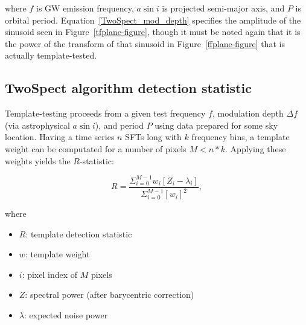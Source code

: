 \noindent where $f$ is GW emission frequency, $a \sin i$ is projected semi-major axis, and $P$ is orbital period.
Equation~\ref{TwoSpect_mod_depth} specifies the amplitude of the sinusoid seen in Figure~\ref{tfplane-figure}, though it must be noted again that it is the power of the transform of that sinusoid in Figure~\ref{ffplane-figure} that is actually template-tested.


\subsection{TwoSpect algorithm detection statistic}


Template-testing proceeds from a given test frequency $f$, modulation depth $\Delta f$ (via astrophysical $a \sin i$), and period $P$ using data prepared for some sky location. 
Having a time series $n$ SFTs long with $k$ frequency bins, a template weight can be computated for a number of pixels $M < n*k$.
Applying these weights yields the $R$-statistic:

\begin{equation}
R=\frac{\Sigma_{i=0}^{M-1}w_{i}[Z_{i}-\lambda_{i}]}{\Sigma_{i=0}^{M-1}[w_{i}]^{2}},
\label{TwoSpect_R_statistic}
\end{equation}

\noindent where
\begin{itemize}
\item $R$: template detection statistic
\item $w$: template weight
\item $i$: pixel index of $M$ pixels
\item $Z$: spectral power (after barycentric correction)
\item $\lambda$: expected noise power
\end{itemize}

